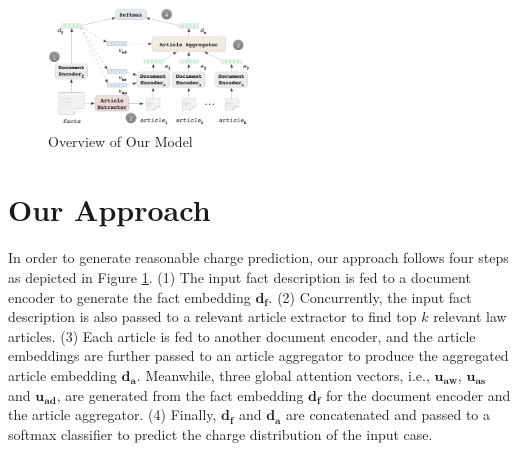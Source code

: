 
\begin{figure}[t!]
\begin{center}
\includegraphics[width=0.48\textwidth]{figures/charge_pred_overview.png}	
\caption{Overview of Our Model}
\label{fig_model_framework}
\end{center}
\end{figure}

\section{Our Approach}
In order to generate reasonable charge prediction, our approach follows four steps as depicted in Figure \ref{fig_model_framework}. 
(1) The input fact description is fed to a document encoder to generate the fact embedding $\mathbf{d_f}$.
(2) Concurrently, the input fact description is also passed to a relevant article extractor to find top $k$ relevant law articles. 
(3) Each article is fed to another document encoder, and the article embeddings are further passed to an article aggregator to produce the aggregated article embedding $\mathbf{d_a}$. Meanwhile, three global attention vectors, i.e., $\mathbf{u_{aw}}$, $\mathbf{u_{as}}$ and $\mathbf{u_{ad}}$, are generated from the fact embedding $\mathbf{d_f}$ for the document encoder and the article aggregator. 
(4) Finally, $\mathbf{d_f}$ and $\mathbf{d_a}$ are concatenated and passed to a softmax classifier to predict the charge distribution of the input case.


